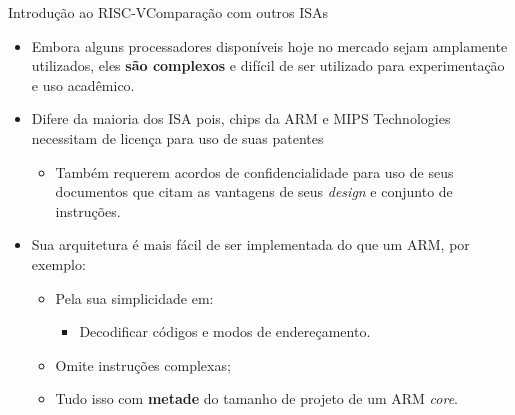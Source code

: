 \documentclass[red, aspectratio=169, xcolor=dvipsnames]{beamer}
\let\olditem=\item%
\renewcommand{\item}{\olditem \justifying}
\begin{document}
\begin{frame}{Introdução ao RISC-V}{Comparação com outros ISAs}
	\begin{itemize}
		\setlength{\itemsep}{1em}
		
		\item Embora alguns processadores disponíveis hoje no mercado sejam amplamente utilizados, eles \textbf{são complexos} e difícil de ser utilizado para experimentação e uso acadêmico.
		
		\item Difere da maioria dos ISA pois, chips da ARM e MIPS Technologies necessitam de licença para uso de suas patentes
		\begin{itemize}
			\item Também requerem acordos de confidencialidade para uso de seus documentos que citam as vantagens de seus \textit{design} e conjunto de instruções.
		\end{itemize}
	
		\item Sua arquitetura é mais fácil de ser implementada do que um ARM, por exemplo:
		\begin{itemize}
			\setlength{\itemsep}{0.5em}
			\item Pela sua simplicidade em:
			\begin{itemize}
				\item Decodificar códigos e modos de endereçamento.
			\end{itemize}
			\item Omite instruções complexas;
			\item Tudo isso com \textbf{metade} do tamanho de projeto de um ARM \textit{core}.
		\end{itemize}
	\end{itemize}
\end{frame}
\end{document}
